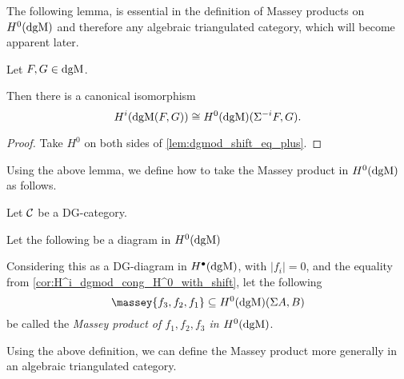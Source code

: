 The following lemma, is essential in the definition of Massey products on \( H^0(\operatorname{dgM}) \) and therefore any algebraic triangulated category, which will become apparent later.

\begin{lemma}
    \label{cor:H^i_dgmod_cong_H^0_with_shift}
    Let \( F, G \in \operatorname{dgM} \).

    Then there is a canonical isomorphism
    \[
        H^i(\operatorname{dgM}(F, G)) \cong H^0(\operatorname{dgM})(\Sigma^{-i} F, G).
    \]
\end{lemma}
\begin{proof}
    Take \( H^0 \) on both sides of \autoref{lem:dgmod_shift_eq_plus}.
\end{proof}

Using the above lemma, we define how to take the Massey product in \( H^0(\operatorname{dgM}) \) as follows.

\begin{definition}
    \label{def:massey_product_H^0(dgMod_dg(C))}
    Let \( {\mathcal{C}} \) be a DG-category.
    
    Let the following be a diagram in \( H^0(\operatorname{dgM}) \)
    \begin{center}
    \end{center}
    Considering this as a DG-diagram in \( H^{\bullet}(\operatorname{dgM}) \), with \( |f_i| = 0 \), and the equality from \autoref{cor:H^i_dgmod_cong_H^0_with_shift}, let the following
    \[
        \massey{f_3, f_2, f_1} \subseteq H^0(\dgM)(\Sigma A, B)
    \]
    be called the \emph{Massey product of \( f_1, f_2, f_3 \) in \( H^0(\operatorname{dgM}) \)}.
\end{definition}

Using the above definition, we can define the Massey product more generally in an algebraic triangulated category.

